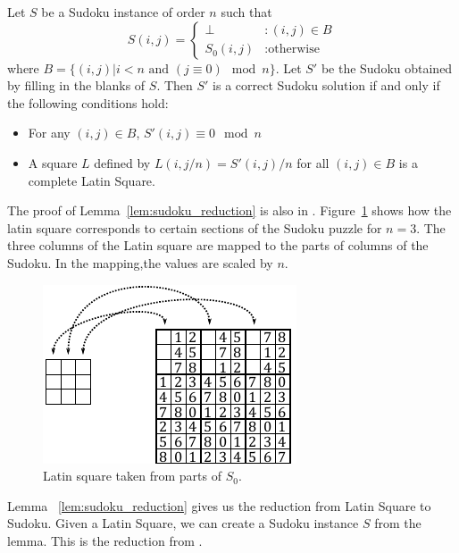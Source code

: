 \documentclass[runningheads,a4paper]{llncs}
\begin{document}
\begin{lemma}
\label{lem:sudoku_reduction}
Let $S$ be a Sudoku instance of order $n$ such that
\begin{displaymath}
S(i,j) = \left\{
\begin{array}{lr}
\perp & : (i,j) \in B\\
S_0 (i,j) & : \text{otherwise}
\end{array}
\right.
\end{displaymath}
where $B = \{ (i,j) | i < n \text{ and } (j \equiv 0) \mod n \}$. Let $S'$ be the Sudoku obtained by filling in the blanks of $S$. Then $S'$ is a correct Sudoku solution if and only if the following conditions hold:
\begin{itemize}
\item For any $(i,j) \in B$, $S'(i,j) \equiv 0 \mod n$
\item A square $L$ defined by $L(i, j/n) = S'(i,j)/n$ for all $(i, j) \in B$ is a complete Latin Square.
\end{itemize}
\end{lemma}

The proof of Lemma~\ref{lem:sudoku_reduction} is also in \cite{takayuki2003complexity}. Figure~\ref{fig:latinsquare_to_sudoku} shows how the latin square corresponds to certain sections of the Sudoku puzzle for $n=3$. The three columns of the Latin square are mapped to the parts of columns of the Sudoku. In the mapping,the values are scaled by $n$. 

\begin{figure}
\centering
\label{fig:latinsquare_to_sudoku}
\includegraphics[width=0.7\linewidth]{latinsquare_to_sudoku.pdf}
\caption{Latin square taken from parts of $S_0$.}
\end{figure}

Lemma ~\ref{lem:sudoku_reduction} gives us the reduction from Latin Square to Sudoku. Given a Latin Square, we can create a Sudoku instance $S$ from the lemma. This is the reduction from \cite{takayuki2003complexity}.
\end{document}
